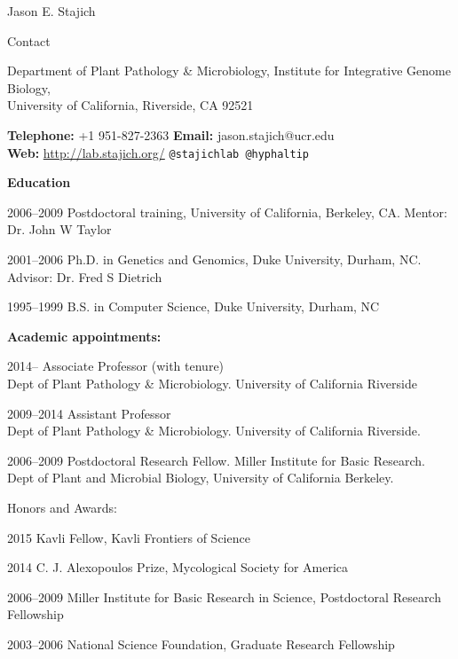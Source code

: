 \documentclass[10pt]{article}
\begin{document}
\begin{cv}{\centerline{Jason E. Stajich}}


\setlength{\cvlabelwidth}{18mm}
\begin{cvlistcompact}{Contact}
\item{Department of Plant Pathology \& Microbiology, Institute for
  Integrative Genome Biology, \\
  University of California, Riverside, CA 92521}
  \item{ \textbf{Telephone:} +1 951-827-2363 \textbf{Email:}
    jason.stajich@ucr.edu \\
    \textbf{Web:} \url{http://lab.stajich.org/} {\tt @stajichlab @hyphaltip}}
\end{cvlistcompact}

\begin{cvlistcompact}{\bf Education}
\item [2006--2009] Postdoctoral training, University of California, Berkeley, CA. Mentor: Dr. John W Taylor
\item [2001--2006] Ph.D. in Genetics and Genomics, Duke University, Durham, NC. Advisor: Dr. Fred S Dietrich
\item [1995--1999] B.S. in Computer Science, Duke University, Durham, NC
\end{cvlistcompact}

\begin{cvlistcompact}{\bf Academic appointments:}
\item [2014--] Associate Professor (with tenure)
  \\ Dept of Plant Pathology \& Microbiology. University of California Riverside
\item [2009--2014] Assistant Professor
  \\ Dept of Plant Pathology \& Microbiology. University of California Riverside.
\item [2006--2009] Postdoctoral Research Fellow. Miller Institute for Basic Research. \\
  Dept of Plant and Microbial Biology, University of California
  Berkeley.
\end{cvlistcompact}

\begin{cvlistcompact}{Honors and Awards:}
\item [2015] Kavli Fellow, Kavli Frontiers of Science
\item [2014] C. J. Alexopoulos Prize, Mycological Society for America
\item [2006--2009] Miller Institute for Basic Research in Science,
  Postdoctoral Research Fellowship
\item [2003--2006] National Science Foundation, Graduate Research Fellowship
\end{cvlistcompact}


\end{cv}
\end{document}
